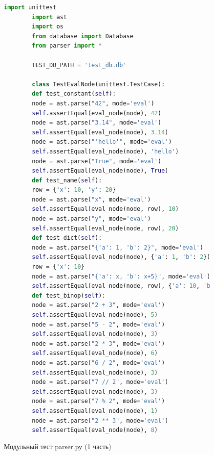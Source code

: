 \begin{figure}[H]
	\begin{lstlisting}[language=Python, breaklines=true]			
		import unittest
		import ast
		import os
		from database import Database
		from parser import *
		
		TEST_DB_PATH = 'test_db.db'
		
		class TestEvalNode(unittest.TestCase):
		def test_constant(self):
		node = ast.parse("42", mode='eval')
		self.assertEqual(eval_node(node), 42)        
		node = ast.parse("3.14", mode='eval')
		self.assertEqual(eval_node(node), 3.14)        
		node = ast.parse("'hello'", mode='eval')
		self.assertEqual(eval_node(node), 'hello')        
		node = ast.parse("True", mode='eval')
		self.assertEqual(eval_node(node), True)
		def test_name(self):
		row = {'x': 10, 'y': 20}
		node = ast.parse("x", mode='eval')
		self.assertEqual(eval_node(node, row), 10)        
		node = ast.parse("y", mode='eval')
		self.assertEqual(eval_node(node, row), 20)
		def test_dict(self):
		node = ast.parse("{'a': 1, 'b': 2}", mode='eval')
		self.assertEqual(eval_node(node), {'a': 1, 'b': 2})        
		row = {'x': 10}
		node = ast.parse("{'a': x, 'b': x+5}", mode='eval')
		self.assertEqual(eval_node(node, row), {'a': 10, 'b': 15})
		def test_binop(self):
		node = ast.parse("2 + 3", mode='eval')
		self.assertEqual(eval_node(node), 5)        
		node = ast.parse("5 - 2", mode='eval')
		self.assertEqual(eval_node(node), 3)        
		node = ast.parse("2 * 3", mode='eval')
		self.assertEqual(eval_node(node), 6)        
		node = ast.parse("6 / 2", mode='eval')
		self.assertEqual(eval_node(node), 3)        
		node = ast.parse("7 // 2", mode='eval')
		self.assertEqual(eval_node(node), 3)        
		node = ast.parse("7 % 2", mode='eval')
		self.assertEqual(eval_node(node), 1)        
		node = ast.parse("2 ** 3", mode='eval')
		self.assertEqual(eval_node(node), 8)		
	\end{lstlisting}  
	\caption{Модульный тест parser.py (1 часть)}
	\label{fig:test_parser_1}
\end{figure}

